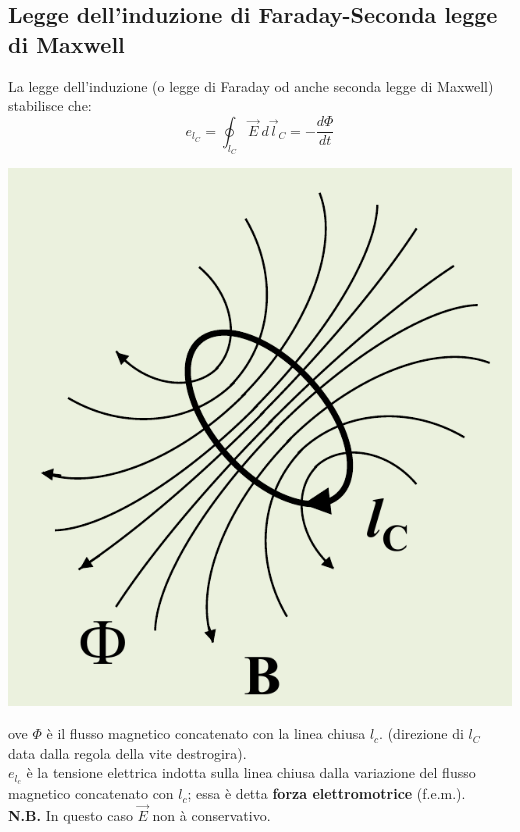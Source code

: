 \documentclass{article}
\begin{document}
\subsection{Legge dell'induzione di Faraday-Seconda legge di Maxwell}
La legge dell'induzione (o legge di Faraday
od anche seconda legge di Maxwell)
stabilisce che:
\[
    e_{l_C} = \oint_{l_C}
    \vec E \ d\vec l_C = -\frac{d \Phi}{dt}
\]
\begin{center}
    \includegraphics[scale=0.3]{Image/Legge di Faraday.png}
\end{center}
ove $\Phi$ è il flusso magnetico concatenato con
la linea chiusa $l_c$. (direzione di $l_C$ data dalla
regola della vite destrogira).\\
$e_{l_c}$ è la tensione elettrica indotta sulla
linea chiusa dalla variazione del flusso
magnetico concatenato con $l_c$; essa è detta
\textbf{forza elettromotrice} (f.e.m.).
\vspace*{0.1cm}\\
\textbf{N.B.} In questo caso $\vec E$ non à conservativo.
\end{document}

